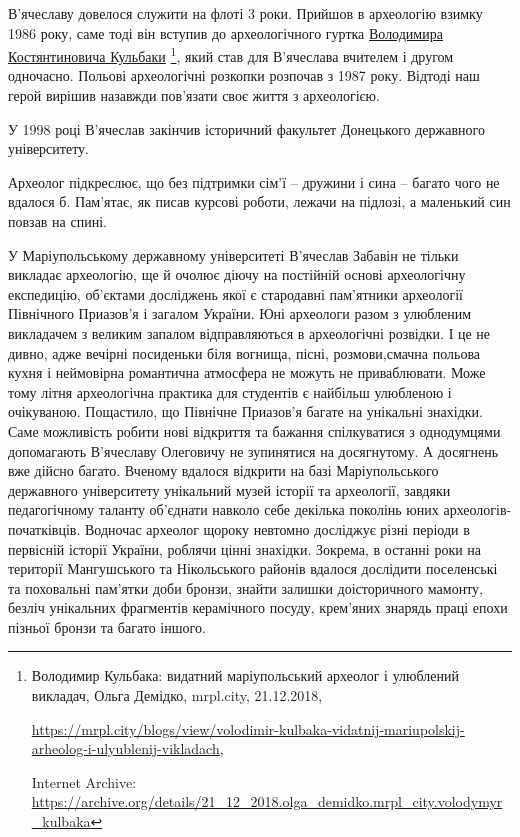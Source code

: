 
В'ячеславу довелося служити на флоті 3 роки. Прийшов в археологію взимку 1986
року, саме тоді він вступив до археологічного гуртка
\href{https://archive.org/details/21_12_2018.olga_demidko.mrpl_city.volodymyr_kulbaka}{Володимира
Костянтиновича Кульбаки}%
\footnote{Володимир Кульбака: видатний маріупольський археолог і улюблений викладач, Ольга Демідко, mrpl.city, 21.12.2018, %
\par\url{https://mrpl.city/blogs/view/volodimir-kulbaka-vidatnij-mariupolskij-arheolog-i-ulyublenij-vikladach}, \par%
Internet Archive: \url{https://archive.org/details/21_12_2018.olga_demidko.mrpl_city.volodymyr_kulbaka}%
},
який став для В'ячеслава вчителем і другом одночасно.
Польові археологічні розкопки розпочав з 1987 року. Відтоді наш герой вирішив
назавжди пов'язати своє життя з археологією.

У 1998 році В'ячеслав закінчив історичний факультет Донецького державного
університету.

Археолог підкреслює, що без підтримки сім'ї – дружини і сина – багато чого не
вдалося б. Пам'ятає, як писав курсові роботи, лежачи на підлозі, а маленький
син повзав на спині.

У Маріупольському державному університеті В'ячеслав Забавін не тільки викладає
археологію, ще й очолює діючу на постійній основі археологічну експедицію,
об'єктами досліджень якої є стародавні пам'ятники археології Північного
Приазов'я і загалом України. Юні археологи разом з улюбленим викладачем з
великим запалом відправляються в археологічні розвідки. І це не дивно, адже
вечірні посиденьки біля вогнища, пісні, розмови,смачна польова кухня і
неймовірна романтична атмосфера не можуть не приваблювати. Може тому літня
археологічна практика для студентів є найбільш улюбленою і очікуваною.
Пощастило, що Північне Приазов'я багате на унікальні знахідки. Саме можливість
робити нові відкриття та бажання спілкуватися з однодумцями допомагають
В'ячеславу Олеговичу не зупинятися на досягнутому. А досягнень вже дійсно
багато. Вченому вдалося відкрити на базі Маріупольського державного
університету унікальний музей історії та археології, завдяки педагогічному
таланту об'єднати навколо себе декілька поколінь юних археологів-початківців.
Водночас археолог щороку невтомно досліджує різні періоди в первісній історії
України, роблячи цінні знахідки. Зокрема, в останні роки на території
Мангушського та Нікольського районів вдалося дослідити поселенські та
поховальні пам'ятки доби бронзи, знайти залишки доісторичного мамонту, безліч
унікальних фрагментів керамічного посуду, крем'яних знарядь праці епохи пізньої
бронзи та багато іншого.

